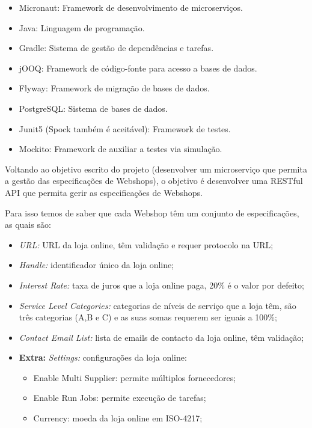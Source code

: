 \begin{itemize}
  \item Micronaut: Framework de desenvolvimento de microserviços.
  \item Java: Linguagem de programação.
  \item Gradle: Sistema de gestão de dependências e tarefas.
  \item jOOQ: Framework de código-fonte para acesso a bases de dados.
  \item Flyway: Framework de migração de bases de dados.
  \item PostgreSQL: Sistema de bases de dados.
  \item Junit5 (Spock também é aceitável): Framework de testes.
  \item Mockito: Framework de auxiliar a testes via simulação.
\end{itemize}

Voltando ao objetivo escrito do projeto (desenvolver um microserviço que permita a gestão das especificações de Webshops), o objetivo é desenvolver uma RESTful API que permita gerir as especificações de Webshops.

Para isso temos de saber que cada Webshop têm um conjunto de especificações, as quais são:

\begin{itemize}
  \item \textit{URL:} URL da loja online, têm validação e requer protocolo na URL;
  \item \textit{Handle:} identificador único da loja online;
  \item \textit{Interest Rate:} taxa de juros que a loja online paga, 20\% é o valor por defeito;
  \item \textit{Service Level Categories:} categorias de níveis de serviço que a loja têm, são três categorias (A,B e C) e as suas somas requerem ser iguais a 100\%;
  \item \textit{Contact Email List:} lista de emails de contacto da loja online, têm validação;
  \item \textbf{Extra:} \textit{Settings:} configurações da loja online:
        \begin{itemize}
          \item Enable Multi Supplier: permite múltiplos fornecedores;
          \item Enable Run Jobs: permite execução de tarefas;
          \item Currency: moeda da loja online em ISO-4217;
        \end{itemize}
\end{itemize}

